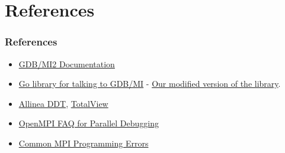 \documentclass{beamer}
\begin{document}
\section{References}
\begin{frame}
  \frametitle{References}
  \begin{itemize}
  \item \href{https://sourceware.org/gdb/onlinedocs/gdb/GDB_002fMI.html}{GDB/MI2 Documentation}
  \item \href{https://github.com/cyrus-and/gdb}{Go library for talking to GDB/MI} - \href{https://github.com/milindl/gdb}{Our modified version of the library}.
  \item \href{https://en.wikipedia.org/wiki/Allinea_DDT}{Allinea DDT}, \href{https://www.roguewave.com/products-services/totalview}{TotalView}
  \item \href{https://www.open-mpi.org/faq/?category=debugging}{OpenMPI FAQ for Parallel Debugging}
  \item \href{http://www.linux-mag.com/id/7210/}{Common MPI Programming Errors}
  \end{itemize}
\end{frame}
\end{document}
